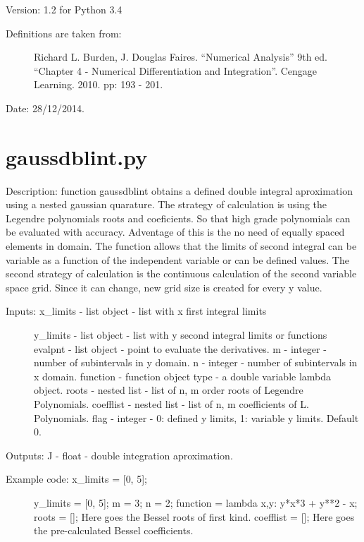 \documentclass[letterpaper,10pt,oneside]{sphinxmanual}
\theoremstyle{plain}%
\theoremstyle{definition}%
\theoremstyle{remark}%
\begin{document}
Version: 1.2 for Python 3.4
\begin{description}
\item[{Definitions are taken from:}] \leavevmode
Richard L. Burden, J. Douglas Faires. ``Numerical Analysis'' 9th ed.
``Chapter 4 - Numerical Differentiation and Integration''. 
Cengage Learning. 2010. pp: 193 - 201.

\end{description}




Date: 28/12/2014.


\section{gaussdblint.py}
\label{code:module-gaussdblint}\label{code:gaussdblint-py}
Description: function gaussdblint obtains a defined double integral 
aproximation using a nested gaussian quarature. The strategy of calculation
is using the Legendre polynomials roots and coeficients. So that high grade 
polynomials can be evaluated with accuracy. Adventage of this is the no
need of equally spaced elements in domain. The function allows that the
limits of second integral can be variable as a function of the independent
variable or can be defined values. The second strategy of calculation is
the continuous calculation of the second variable space grid. Since
it can change, new grid size is created for every y value.
\begin{description}
\item[{Inputs: x\_limits - list object - list with x first integral limits}] \leavevmode
y\_limits - list object - list with y second integral limits or functions
evalpnt - list object - point to evaluate the derivatives.
m - integer - number of subintervals in y domain.
n - integer - number of subintervals in x domain.
function - function object type - a double variable lambda object.
roots - nested list - list of n, m order roots of Legendre Polynomials.
coefflist - nested list - list of n, m coefficients of L. Polynomials.
flag - integer - 0: defined y limits, 1: variable y limits. Default 0.

\end{description}

Outputs: J - float - double integration aproximation.
\begin{description}
\item[{Example code: x\_limits = {[}0, 5{]};}] \leavevmode
y\_limits = {[}0, 5{]};
m = 3;
n = 2;
function = lambda x,y: y*x*3 + y**2 - x;
roots = {[}{]}; Here goes the Bessel roots of first kind.
coefflist = {[}{]}; Here goes the pre-calculated Bessel coefficients.

\end{description}
\end{document}
